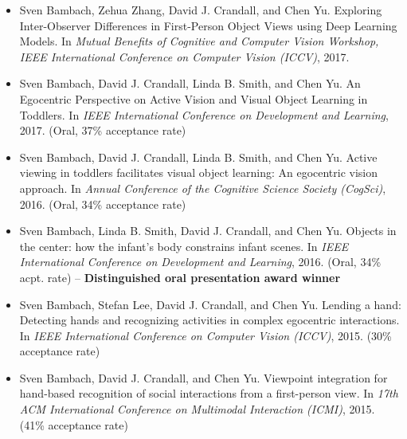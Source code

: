 \documentclass[10pt]{article}
\newenvironment{outerlist}[1][\enskip\textbullet]%
        {\begin{itemize}[#1,leftmargin=*,parsep=5pt,itemsep=0pt,topsep=0pt,partopsep=0pt]}{\end{itemize}%
         \vspace{-.6\baselineskip}}
\begin{document}
\begin{outerlist}


    \item Sven Bambach, Zehua Zhang, David J. Crandall, and Chen Yu. Exploring Inter-Observer Differences in First-Person Object Views using Deep Learning Models.
    In \emph{Mutual Benefits of Cognitive and Computer Vision Workshop, IEEE International Conference on Computer Vision (ICCV)}, 2017.

    \item Sven Bambach, David J. Crandall, Linda B. Smith, and Chen Yu. An Egocentric Perspective on Active Vision and Visual Object Learning in Toddlers.
    In \emph{IEEE International Conference on Development and Learning}, 2017.
    (Oral, 37\% acceptance rate)

    \item Sven Bambach, David J. Crandall, Linda B. Smith, and Chen Yu. Active viewing in toddlers facilitates visual object learning: An egocentric vision approach.
    In \emph{Annual Conference of the Cognitive Science Society (CogSci)}, 2016.
    (Oral, 34\% acceptance rate)

    \item Sven Bambach, Linda B. Smith, David J. Crandall, and Chen Yu. Objects in the center: how the infant's body constrains infant scenes.
    In \emph{IEEE International Conference on Development and Learning}, 2016.
    (Oral, 34\% acpt. rate) -- \textbf{Distinguished oral presentation award winner}


    \item Sven Bambach, Stefan Lee, David J. Crandall, and Chen Yu.
    Lending a hand: Detecting hands and recognizing activities in complex egocentric interactions.
    In \emph{IEEE International Conference on Computer Vision (ICCV)}, 2015.
    (30\% acceptance rate)

    \item Sven Bambach, David J. Crandall, and Chen Yu. Viewpoint integration for hand-based recognition of social interactions from a first-person view.
    In \emph{17th ACM International Conference on Multimodal Interaction (ICMI)}, 2015. (41\% acceptance rate)



\end{outerlist}
\end{document}
